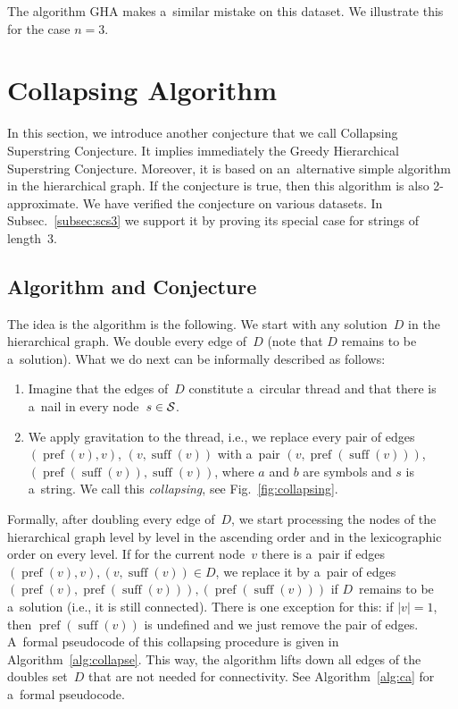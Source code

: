 \documentclass[11pt,letterpaper]{article}
\DeclareMathOperator{\pref}{pref}
\DeclareMathOperator{\suff}{suff}
\begin{document}
 The algorithm GHA makes a~similar mistake on this dataset. We illustrate this for the case $n=3$.



\section{Collapsing Algorithm}
In this section, we introduce another conjecture that
we call Collapsing Superstring Conjecture. It implies immediately the Greedy Hierarchical Superstring Conjecture. Moreover, it is based on an~alternative simple algorithm in the hierarchical graph. If the conjecture is true, then this algorithm is also 2-approximate. We have verified the conjecture on various datasets. In Subsec.~\ref{subsec:scs3} we support it by proving its special case for strings of length~3.

\subsection{Algorithm and Conjecture}
The idea is the algorithm is the following. 
We start with any solution~$D$ in the hierarchical graph. 
We double every edge of~$D$ (note that $D$ remains to be a~solution). What we do next can be informally described as follows:
\begin{enumerate}
\item Imagine that the edges of~$D$ constitute a~circular thread and that there is a~nail in every node~$s \in {\cal S}$.
\item We apply gravitation to the thread, i.e., we replace every pair of edges $(\pref(v), v)$, $(v, \suff(v))$ 
with a~pair $(v, \pref(\suff(v)))$, $(\pref(\suff(v)), \suff(v))$, where $a$ and $b$ are symbols and $s$ is a~string. We call this {\em collapsing}, see Fig.~\ref{fig:collapsing}.
\end{enumerate}
Formally, after doubling every edge of~$D$, we start processing the nodes of the hierarchical graph level by level in the ascending order and in the lexicographic order on every level. If for the current node~$v$ there is a~pair if edges $(\pref(v), v), (v, \suff(v)) \in D$, we replace it by a~pair of edges $(\pref(v), \pref(\suff(v))), (\pref(\suff(v)))$ if $D$~remains to be a~solution (i.e., it is still connected). There is one exception for this: if $|v|=1$, then $\pref(\suff(v))$ is undefined and we just remove the pair of edges. 
A~formal pseudocode of this collapsing procedure is given in Algorithm~\ref{alg:collapse}. This way, the algorithm lifts down all edges of the doubles set~$D$ that are not needed for connectivity. See Algorithm~\ref{alg:ca} for a~formal pseudocode.
\end{document}
